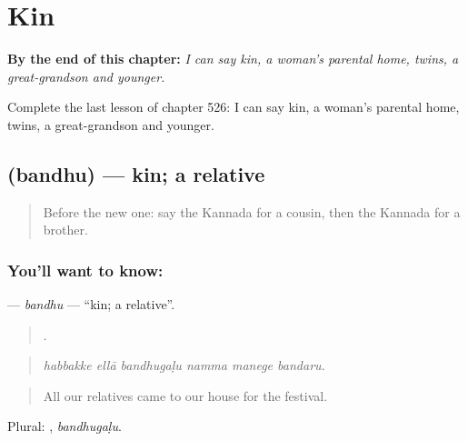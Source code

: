 
\chapter{Kin}
\label{ch:ka-kin}

\begin{chapteropening}
\textbf{By the end of this chapter:} \emph{I can say kin, a woman's parental home, twins, a great-grandson and younger.}

Complete the last lesson of chapter 526: I can say kin, a woman's parental home, twins, a great-grandson and younger.
\end{chapteropening}

\section[\texorpdfstring{\kn{ಬಂಧು} (bandhu)}{ಬಂಧು (bandhu)}]{ (bandhu) — kin; a relative}

\label{lesson:KA-C526-bandhu}



\begin{quote}
Before the new one: say the Kannada for a cousin, then the Kannada for a brother.
\end{quote}

\subsection*{You'll want to know: }
\textbf{} — \emph{bandhu} — \textquotedblleft{}kin; a relative\textquotedblright{}.

\begin{quote}
     .
\end{quote}

\begin{quote}
\emph{habbakke ellā bandhugaḷu namma manege bandaru.}
\end{quote}

\begin{quote}
All our relatives came to our house for the festival.
\end{quote}

Plural: , \emph{bandhugaḷu}.

